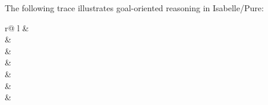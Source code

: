 \begin{isabellebody}
\begin{isamarkuptext}
  The following trace illustrates goal-oriented reasoning in
  Isabelle/Pure:

  {\footnotesize
  \medskip
  \begin{tabular}{r@ {\quad}l}
   &  \\
   &  \\
   &  \\
   &  \\
   &  \\
  \isa{{\isachardoublequote}{\isacharhash}{\isasymdots}{\isachardoublequote}} &  \\
   &  \\
  \end{tabular}
  \medskip
  }


\end{isamarkuptext}
\end{isabellebody}
